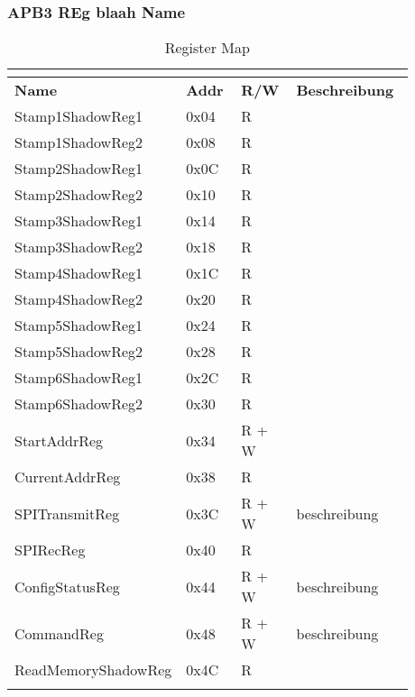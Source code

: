 
\subsubsection{APB3 REg blaah Name}
\begin{longtable} [htb] { |p{0.3\linewidth}|p{0.14\linewidth}|p{0.14\linewidth}|p{0.3\linewidth}| } \hline
	\label{tab:table3}\\
	\hline
	\textbf{Name} & \textbf{Addr}& \textbf{R/W}&\textbf{Beschreibung}\\
	\hline
	Stamp1ShadowReg1&0x04&R&\\
	\hline
	Stamp1ShadowReg2&0x08&R&\\
	\hline
	Stamp2ShadowReg1&0x0C&R&\\
	\hline
	Stamp2ShadowReg2&0x10&R&\\
	\hline
	Stamp3ShadowReg1&0x14&R&\\
	\hline
	Stamp3ShadowReg2&0x18&R&\\
	\hline
	Stamp4ShadowReg1&0x1C&R&\\
	\hline
	Stamp4ShadowReg2&0x20&R&\\
	\hline
	Stamp5ShadowReg1&0x24&R&\\
	\hline
	Stamp5ShadowReg2&0x28&R&\\
	\hline
	Stamp6ShadowReg1&0x2C&R&\\
	\hline
	Stamp6ShadowReg2&0x30&R&\\
	\hline
	StartAddrReg&0x34&R + W&\\
	\hline
	CurrentAddrReg&0x38&R&\\
	\hline
	SPITransmitReg&0x3C&R + W&beschreibung\\
	\hline
	SPIRecReg&0x40&R&\\
	\hline
	ConfigStatusReg&0x44&R + W&beschreibung\\
	\hline
	CommandReg&0x48&R + W&beschreibung\\
	\hline
	ReadMemoryShadowReg&0x4C&R&\\
	\hline
\caption{Register Map}
\end{longtable}
	